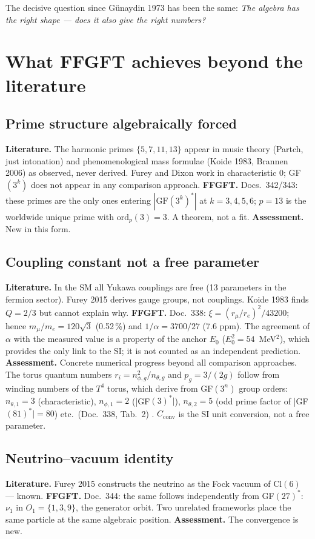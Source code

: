 The decisive question since Günaydin 1973 has been the same:
\emph{The algebra has the right shape --- does it also give the right numbers?}

\section{What FFGFT achieves beyond the literature}

\subsection{Prime structure algebraically forced \BM}
\textbf{Literature.} The harmonic primes $\{5,7,11,13\}$ appear in music theory
(Partch, just intonation) and phenomenological mass formulae (Koide 1983, Brannen 2006)
as observed, never derived. Furey and Dixon work in characteristic 0; GF$(3^k)$
does not appear in any comparison approach.
\textbf{FFGFT.} Docs.~342/343: these primes are the only ones entering
$|\mathrm{GF}(3^k)^*|$ at $k=3,4,5,6$; $p=13$ is the worldwide unique prime with
$\mathrm{ord}_p(3)=3$. A theorem, not a fit.
\textbf{Assessment.} New in this form.

\subsection{Coupling constant not a free parameter \KM}
\textbf{Literature.} In the SM all Yukawa couplings are free (13 parameters in the
fermion sector). Furey 2015 derives gauge groups, not couplings. Koide 1983 finds
$Q=2/3$ but cannot explain why.
\textbf{FFGFT.} Doc.~338: $\xi=(r_\mu/r_e)^2/43200$; hence $m_\mu/m_e=120\sqrt3$
(0.52\,\%) and $1/\alpha=3700/27$ (7.6 ppm). The agreement of $\alpha$ with the
measured value is a property of the anchor $E_0$ ($E_0^2=54$~MeV$^2$), which provides
the only link to the SI; it is not counted as an independent prediction.
\textbf{Assessment.} Concrete numerical progress beyond all comparison approaches.
The torus quantum numbers $r_i=n_{\phi,g}^2/n_{\theta,g}$ and $p_g=3/(2g)$
follow from winding numbers of the $T^4$ torus, which derive from
GF$(3^n)$ group orders: $n_{\theta,1}=3$ (characteristic),
$n_{\phi,1}=2$ (|GF$(3)^*|$), $n_{\theta,2}=5$ (odd prime factor
of |GF$(81)^*|=80$) etc.\ (Doc.~338, Tab.~2) \KM.
$C_\text{conv}$ is the SI unit conversion, not a free parameter.

\subsection{Neutrino--vacuum identity \BM}
\textbf{Literature.} Furey 2015 constructs the neutrino as the Fock vacuum of Cl$(6)$ ---
known. \textbf{FFGFT.} Doc.~344: the same follows independently from GF$(27)^*$:
$\nu_1$ in $O_1=\{1,3,9\}$, the generator orbit. Two unrelated frameworks place
the same particle at the same algebraic position.
\textbf{Assessment.} The convergence is new.

